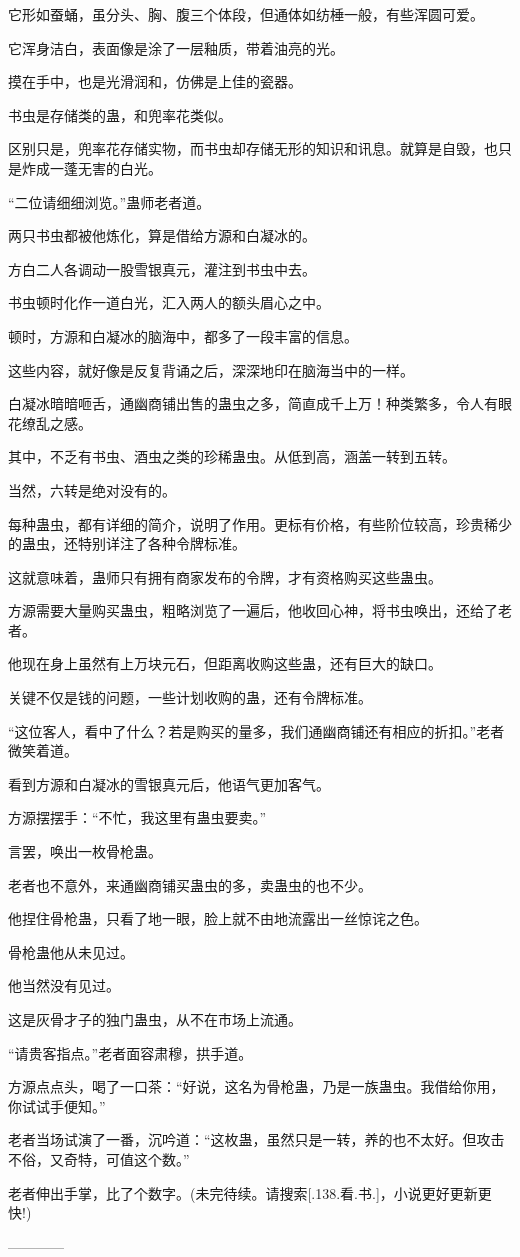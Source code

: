 \begin{this_body}
它形如蚕蛹，虽分头、胸、腹三个体段，但通体如纺棰一般，有些浑圆可爱。

它浑身洁白，表面像是涂了一层釉质，带着油亮的光。

摸在手中，也是光滑润和，仿佛是上佳的瓷器。

书虫是存储类的蛊，和兜率花类似。

区别只是，兜率花存储实物，而书虫却存储无形的知识和讯息。就算是自毁，也只是炸成一蓬无害的白光。

“二位请细细浏览。”蛊师老者道。

两只书虫都被他炼化，算是借给方源和白凝冰的。

方白二人各调动一股雪银真元，灌注到书虫中去。

书虫顿时化作一道白光，汇入两人的额头眉心之中。

顿时，方源和白凝冰的脑海中，都多了一段丰富的信息。

这些内容，就好像是反复背诵之后，深深地印在脑海当中的一样。

白凝冰暗暗咂舌，通幽商铺出售的蛊虫之多，简直成千上万！种类繁多，令人有眼花缭乱之感。

其中，不乏有书虫、酒虫之类的珍稀蛊虫。从低到高，涵盖一转到五转。

当然，六转是绝对没有的。

每种蛊虫，都有详细的简介，说明了作用。更标有价格，有些阶位较高，珍贵稀少的蛊虫，还特别详注了各种令牌标准。

这就意味着，蛊师只有拥有商家发布的令牌，才有资格购买这些蛊虫。

方源需要大量购买蛊虫，粗略浏览了一遍后，他收回心神，将书虫唤出，还给了老者。

他现在身上虽然有上万块元石，但距离收购这些蛊，还有巨大的缺口。

关键不仅是钱的问题，一些计划收购的蛊，还有令牌标准。

“这位客人，看中了什么？若是购买的量多，我们通幽商铺还有相应的折扣。”老者微笑着道。

看到方源和白凝冰的雪银真元后，他语气更加客气。

方源摆摆手：“不忙，我这里有蛊虫要卖。”

言罢，唤出一枚骨枪蛊。

老者也不意外，来通幽商铺买蛊虫的多，卖蛊虫的也不少。

他捏住骨枪蛊，只看了地一眼，脸上就不由地流露出一丝惊诧之色。

骨枪蛊他从未见过。

他当然没有见过。

这是灰骨才子的独门蛊虫，从不在市场上流通。

“请贵客指点。”老者面容肃穆，拱手道。

方源点点头，喝了一口茶：“好说，这名为骨枪蛊，乃是一族蛊虫。我借给你用，你试试手便知。”

老者当场试演了一番，沉吟道：“这枚蛊，虽然只是一转，养的也不太好。但攻击不俗，又奇特，可值这个数。”

老者伸出手掌，比了个数字。(未完待续。请搜索[.138.看.书.]，小说更好更新更快!)

------------

\end{this_body}

